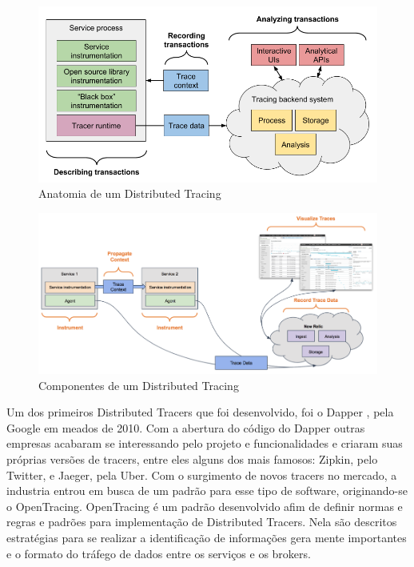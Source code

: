 	\begin{figure}[htb]
		\caption{\label{fig_tracing_concept}Anatomia de um Distributed Tracing}
		\begin{center}
		\includegraphics[scale=0.5]{pictures/tracing_concept.png}
		\end{center}
	\end{figure}
	
	\begin{figure}[htb]
		\caption{\label{fig_tracing_components}Componentes de um Distributed Tracing}
		\begin{center}
		\includegraphics[scale=0.95]{pictures/distributed-tracing-components.png}
		\end{center}
	\end{figure}
	
	Um dos primeiros Distributed Tracers que foi desenvolvido, foi o Dapper \cite{googledapper}, pela Google em meados de 2010. Com a abertura do código do Dapper outras empresas acabaram se interessando pelo projeto e funcionalidades e criaram suas próprias versões de tracers, entre eles alguns dos mais famosos: Zipkin\cite{zipkin}, pelo Twitter, e Jaeger\cite{jaegerarch}, pela Uber. Com o surgimento de novos tracers no mercado, a industria entrou em busca de um padrão para esse tipo de software, originando-se o OpenTracing\cite{opentracing}. OpenTracing é um padrão desenvolvido afim de definir normas e regras e padrões para implementação de Distributed Tracers. Nela são descritos estratégias para se realizar a identificação de informações gera mente importantes e o formato do tráfego de dados entre os serviços e os brokers.
	
